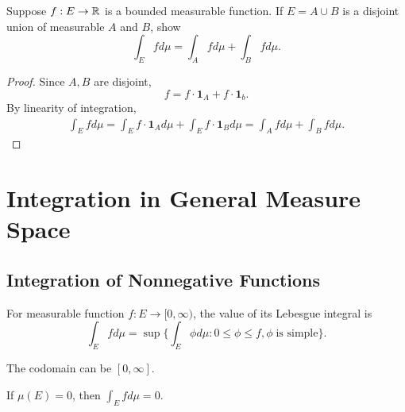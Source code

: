 \documentclass[class=book, crop=false]{standalone}
\begin{document}
        \begin{question}
            Suppose $f: E \rightarrow \mathbb{R}$ is a bounded measurable function. If $E = A \cup B$ is a disjoint union of measurable $A$ and $B$, show
            \begin{equation*}
                \int_{E} f d\mu = \int_{A} f d\mu + \int_{B} f d\mu.
            \end{equation*}
        \end{question}

        \begin{proof}
            Since $A, B$ are disjoint,
            \begin{equation*}
                f = f \cdot \mathbf{1}_A + f \cdot \mathbf{1}_b.
            \end{equation*}
            By linearity of integration,
            \begin{align*}
                \int_E f d\mu = \int_E f \cdot \mathbf{1}_A d\mu + \int_E f \cdot \mathbf{1}_B d\mu = \int_A f d\mu + \int_B f d\mu.
            \end{align*}
        \end{proof}


    \section{Integration in General Measure Space}
        \subsection{Integration of Nonnegative Functions}
        \begin{definition}
            For measurable function $f : E \rightarrow [0, \infty)$, the value of its Lebesgue integral is
            \begin{equation*}
                \int_E f d\mu = \sup\{\int_E \phi d\mu : 0 \leq \phi \leq f, \phi \;\text{is simple}\}.
            \end{equation*}
        \end{definition}
        \begin{remark}
            The codomain can be $[0, \infty]$.
        \end{remark}

        \begin{theorem}
            If $\mu(E) = 0$, then $\int_E f d\mu = 0$.
        \end{theorem}
\end{document}
